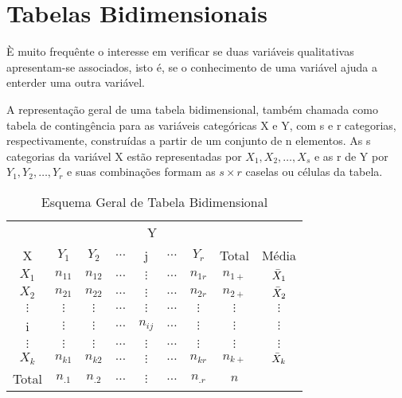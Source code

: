 \newpage

\section{Tabelas Bidimensionais}

È muito frequênte o interesse em verificar se duas variáveis
qualitativas apresentam-se associados, isto é, se o conhecimento de uma
variável ajuda a enterder uma outra variável.\vskip0.3cm


A representação geral de uma tabela bidimensional, também chamada como tabela de contingência
para as variáveis categóricas X e Y, com s e r categorias, respectivamente, construídas a partir de um conjunto de n elementos. As s categorias da variável X estão representadas por $X_{1},X_{2},\ldots,X_{s}$ e as r de Y por $Y_{1},Y_{2},\ldots,Y_{r}$ e suas combinações formam as $s \times r$ caselas ou células da tabela.


\begin{table}[!htb]
    \centering
    {
    \caption{Esquema Geral de Tabela Bidimensional}
    \label{Bidimensional}
    \vspace{0.2cm}
\begin{tabular}{c|c|c|c|c|c|c|c|c}
  \hline\hline
                  &  \multicolumn{7}{c}{Y} \\
\cline{2-9}
  X               & $Y_{1}$     & $Y_{2}$     & $\ldots$  & j        & $\ldots$  & $Y_{r}$  & Total    &  Média \\
  \hline
  $X_{1}$         & $ n_{11}$   & $ n_{12}$   & $\ldots$  & $\vdots$ & $\ldots$  & $n_{1r}$ & $n_{1+}$ & $\Bar{X}_{1}$\\
  $X_{2}$         & $ n_{21}$   & $ n_{22}$   & $\ldots$  & $\vdots$ & $\ldots$  & $n_{2r}$ & $n_{2+}$ & $\Bar{X}_{2}$\\
  $\vdots$        & $\vdots$    & $\vdots$    & $\ldots$  & $\vdots$ & $\ldots$  & $\vdots$ & $\vdots$ & $\vdots$\\
  i               & $\vdots$    & $\vdots$    & $\ldots$  & $n_{ij}$ & $\ldots$  & $\vdots$ & $\vdots$ & $\vdots$  \\
  $\vdots$        & $\vdots$    & $\vdots$    & $\ldots$  & $\vdots$ & $\ldots$  & $\vdots$ & $\vdots$ &  $\vdots$\\
  $X_{k}$         & $ n_{k1}$   & $ n_{k2}$   & $\ldots$  & $\vdots$ & $\ldots$  & $n_{kr}$ & $n_{k+}$ & $\Bar{X}_{k}$ \\
  \hline\hline
  Total              & $n_{.1}$    & $n_{.2}$    & $\ldots$  & $\vdots$ & $\ldots$  & $n_{.r}$ & $n$      & \\
   \hline\hline
\end{tabular}}
\end{table}


